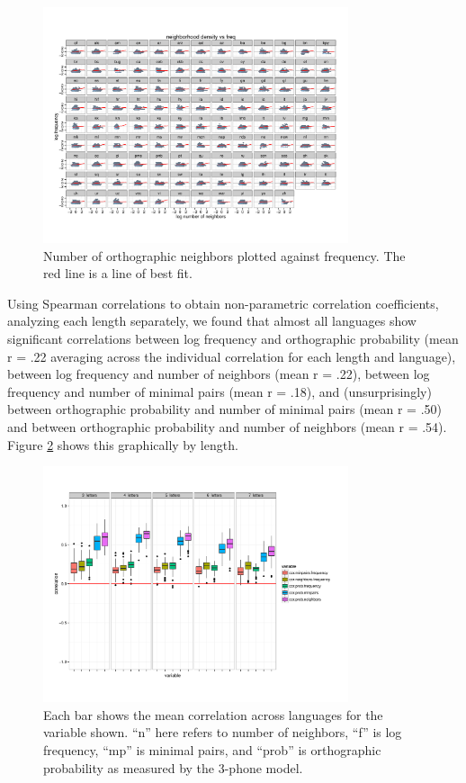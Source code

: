\documentclass{article}
\begin{document}
\begin{figure}[htbp]
  \centering
  \includegraphics[width=0.8\textwidth]{PDFs/big_cor2_neighborsvsfreq.pdf}
  \caption{Number of orthographic neighbors plotted against frequency. The red line is a line of best fit.}
  \label{neighborsvfreq}
\end{figure}

Using Spearman correlations to obtain non-parametric correlation coefficients, analyzing
each length separately, we found
that almost all languages show significant correlations between log frequency and orthographic probability
(mean r = .22 averaging across the individual correlation for each length and language),
between log frequency and number of neighbors (mean r = .22), between log frequency and number of minimal
pairs (mean r = .18), and
(unsurprisingly) between orthographic probability and number of minimal pairs (mean r = .50) and between orthographic
probability and number of neighbors (mean r = .54). Figure \ref{cor.test} shows this graphically by length.

\begin{figure}[htbp]
  \centering
  \includegraphics[width=0.8\textwidth]{PDFs/violins_of_stats.pdf}
  \caption{Each bar shows the mean correlation across languages for the variable shown. ``n'' here refers to
    number of neighbors, ``f'' is log frequency, ``mp'' is minimal pairs, and ``prob'' is orthographic
    probability as measured by the 3-phone model.}
  \label{cor.test}
\end{figure}
\end{document}
